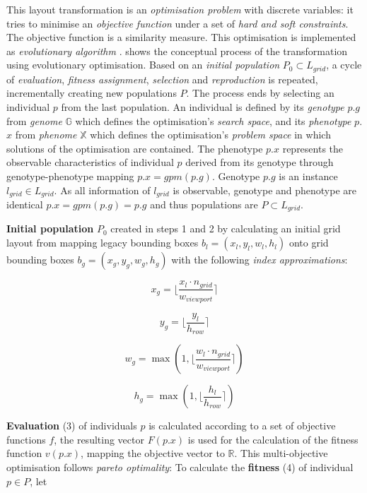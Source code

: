 This layout transformation is an \emph{optimisation problem} with discrete variables: it tries to minimise an \emph{objective function} under a set of \emph{hard and soft constraints}.
The objective function is a similarity measure.
This optimisation is implemented as \emph{evolutionary algorithm} \autocite{Weise2009Optimization}.
 shows the conceptual process of the transformation using evolutionary optimisation.
Based on an \emph{initial population} \(P_0 \subset L_{grid}\), a cycle of \emph{evaluation}, \emph{fitness assignment}, \emph{selection} and \emph{reproduction} is repeated, incrementally creating new populations \(P\).
The process ends by selecting an individual \(p\) from the last population.
An individual is defined by its \emph{genotype} \(p\).\(g\) from \emph{genome} \(\mathbb{G}\) which defines the optimisation's \emph{search space}, and its \emph{phenotype} \(p\).\(x\) from \emph{phenome} \(\mathbb{X}\) which defines the optimisation's \emph{problem space} in which solutions of the optimisation are contained.
The phenotype \(p\).\(x\) represents the observable characteristics of individual \(p\) derived from its genotype through genotype-phenotype mapping \(p.x = gpm(p.g)\).
Genotype \(p.g\) is an instance \(l_{grid} \in L_{grid}\).
As all information of \(l_{grid}\) is observable, genotype and phenotype are identical \(p.x = gpm(p.g) = p.g\) and thus populations are \(P \subset L_{grid}\).

\textbf{Initial population} \(P_0\) created in steps 1 and 2 by calculating an initial grid layout from mapping legacy bounding boxes \(b_l = (x_l, y_l, w_l, h_l)\) onto grid bounding boxes \(b_g = (x_g, y_g, w_g, h_g) \) with the following \emph{index approximations}:

\[x_g =  \Big \lfloor \frac{x_l \cdot n_{grid}}{w_{viewport}} \Big \rceil\]

\[y_g = \Big \lfloor \frac{y_l}{h_{row}} \Big \rceil\]

\[w_g = \max(1, \Big \lfloor \frac{w_l \cdot n_{grid}}{w_{viewport}} \Big \rceil)\]

\[h_g = \max{(1,   \Big \lfloor \frac{h_l}{h_{row}} \Big \rceil)}\]

\textbf{Evaluation} (3) of individuals \(p\) is calculated according to a set of objective functions \(f\), the resulting vector \(F(p.x)\) is used for the calculation of the fitness function \(v(p.x)\), mapping the objective vector to \(\mathbb{R}\).
This multi-objective optimisation follows \emph{pareto optimality}: To calculate the \textbf{fitness} (4) of individual \(p \in P\), let

